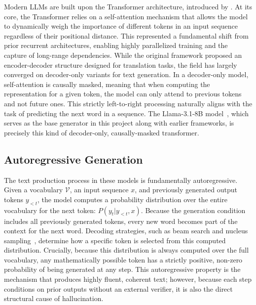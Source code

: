 Modern LLMs are built upon the Transformer architecture, introduced by \citet{vaswani2017attention}. At its core, the Transformer relies on a self-attention mechanism that allows the model to dynamically weigh the importance of different tokens in an input sequence regardless of their positional distance. This represented a fundamental shift from prior recurrent architectures, enabling highly parallelized training and the capture of long-range dependencies. While the original framework proposed an encoder-decoder structure designed for translation tasks, the field has largely converged on decoder-only variants for text generation. In a decoder-only model, self-attention is causally masked, meaning that when computing the representation for a given token, the model can only attend to previous tokens and not future ones. This strictly left-to-right processing naturally aligns with the task of predicting the next word in a sequence. The Llama-3.1-8B model~\citep{dubey2024llama3}, which serves as the base generator in this project along with earlier frameworks, is precisely this kind of decoder-only, causally-masked transformer.

\subsection{Autoregressive Generation}

The text production process in these models is fundamentally autoregressive. Given a vocabulary $\mathcal{V}$, an input sequence $x$, and previously generated output tokens $y_{<t}$, the model computes a probability distribution over the entire vocabulary for the next token: $P(y_t | y_{<t}, x)$. Because the generation condition includes all previously generated tokens, every new word becomes part of the context for the next word. Decoding strategies, such as beam search and nucleus sampling~\citep{holtzman2020curious}, determine how a specific token is selected from this computed distribution. Crucially, because this distribution is always computed over the full vocabulary, any mathematically possible token has a strictly positive, non-zero probability of being generated at any step. This autoregressive property is the mechanism that produces highly fluent, coherent text; however, because each step conditions on prior outputs without an external verifier, it is also the direct structural cause of hallucination.

